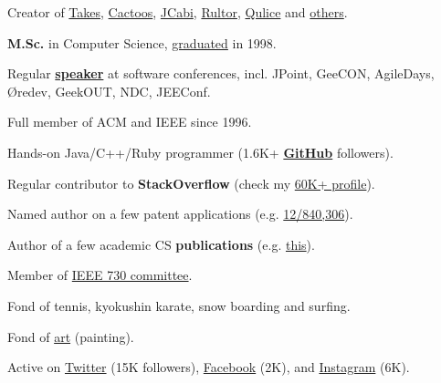 \documentclass[12pt]{article}
\begin{document}
Creator of \href{http://www.takes.org}{Takes},
  \href{http://www.cactoos.org}{Cactoos},
  \href{http://www.jcabi.com}{JCabi},
  \href{http://www.rultor.com}{Rultor},
  \href{http://www.qulice.com}{Qulice} and
  \href{http://www.yegor256.com/pets.html}{others}.

\textbf{M.Sc.} in Computer Science,
  \href{https://en.wikipedia.org/wiki/Oles_Honchar_Dnipro_National_University}{graduated} in 1998.

Regular \textbf{\href{http://www.yegor256.com/talks.html}{speaker}}
  at software conferences, incl. JPoint, GeeCON, AgileDays, {\O}redev, GeekOUT, NDC, JEEConf.

Full member of ACM and IEEE since 1996.

Hands-on Java/C++/Ruby programmer
  (1.6K+ \textbf{\href{https://github.com/yegor256}{GitHub}} followers).

Regular contributor to \textbf{StackOverflow}
  (check my \href{https://stackexchange.com/users/63162/yegor256}{60K+ profile}).

Named author on a few patent applications
  (e.g. \href{https://www.google.com/patents/US20120023476}{12/840,306}).

Author of a few academic CS \textbf{publications}
  (e.g. \href{link.springer.com/chapter/10.1007/978-3-642-02152-7_6}{this}).

Member of \href{http://standards.ieee.org/develop/wg/730.html}{IEEE 730 committee}.

Fond of tennis, kyokushin karate, snow boarding and surfing.

Fond of \href{http://www.yegor256.com/paintings.html}{art} (painting).

Active on
  \href{https://twitter.com/intent/follow?screen_name=yegor256}{Twitter} (15K followers),
  \href{https://www.facebook.com/yegor256}{Facebook} (2K),
  and \href{https://instagram.com/yegor256}{Instagram} (6K).
\end{document}
